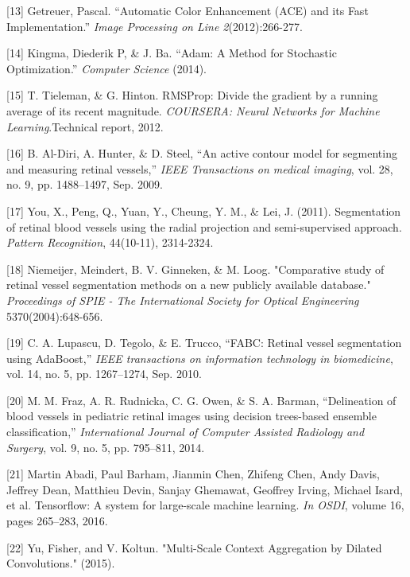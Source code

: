 \documentclass{article}
\begin{document}
[13] Getreuer, Pascal. “Automatic Color Enhancement (ACE) and its Fast Implementation.” {\it Image Processing on Line 2}(2012):266-277.


[14] Kingma, Diederik P, \& J. Ba. “Adam: A Method for Stochastic Optimization.” {\it Computer Science }(2014).

[15] T. Tieleman, \& G. Hinton. RMSProp: Divide the gradient by a running average of its recent magnitude. {\it COURSERA: Neural Networks for Machine Learning}.Technical report, 2012. 

[16] B. Al-Diri, A. Hunter, \& D. Steel, “An active contour model for segmenting and measuring retinal vessels,” {\it IEEE Transactions on medical imaging}, vol. 28, no. 9, pp. 1488–1497, Sep. 2009.

[17] You, X., Peng, Q., Yuan, Y., Cheung, Y. M., \& Lei, J. (2011). Segmentation of retinal blood vessels using the radial projection and semi-supervised approach. {\it Pattern Recognition}, 44(10-11), 2314-2324.

[18] Niemeijer, Meindert, B. V. Ginneken, \& M. Loog. "Comparative study of retinal vessel segmentation methods on a new publicly available database." {\it Proceedings of SPIE - The International Society for Optical Engineering} 5370(2004):648-656.


[19] C. A. Lupascu, D. Tegolo, \& E. Trucco, “FABC: Retinal vessel segmentation using AdaBoost,” {\it IEEE transactions on information technology in biomedicine}, vol. 14, no. 5, pp. 1267–1274, Sep. 2010.


[20] M. M. Fraz, A. R. Rudnicka, C. G. Owen, \& S. A. Barman, “Delineation of blood vessels in pediatric retinal images using decision trees-based ensemble classification,” {\it International Journal of Computer Assisted Radiology and Surgery}, vol. 9, no. 5, pp. 795–811, 2014.

[21] Martin Abadi, Paul Barham, Jianmin Chen, Zhifeng Chen, Andy Davis, Jeffrey Dean, Matthieu Devin, Sanjay Ghemawat, Geoffrey Irving, Michael Isard, et al. Tensorflow: A system for large-scale machine learning. {\it In OSDI}, volume 16, pages 265–283, 2016.

[22] Yu, Fisher, and V. Koltun. "Multi-Scale Context Aggregation by Dilated Convolutions." (2015).
\end{document}
